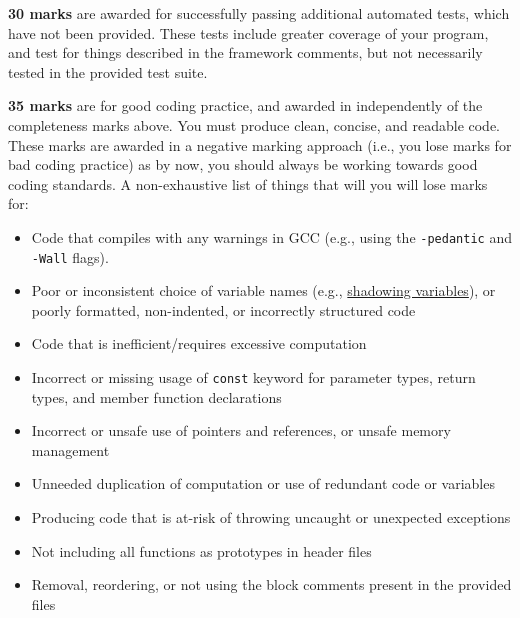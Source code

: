 \documentclass[a4paper]{article}
\begin{document}
\noindent{}\textbf{30 marks} are awarded for successfully passing additional automated tests, which have not been provided. These tests include greater coverage of your program, and test for things described in the framework comments, but not necessarily tested in the provided test suite.

\noindent{}\textbf{35 marks} are for good coding practice, and awarded in independently of the completeness marks above. You must produce clean, concise, and readable code. These marks are awarded in a negative marking approach (i.e., you lose marks for bad coding practice) as by now, you should always be working towards good coding standards. A non-exhaustive list of things that will you will lose marks for:
\begin{itemize}
    \item Code that compiles with any warnings in GCC (e.g., using the \texttt{-pedantic} and \texttt{-Wall} flags).

    \item Poor or inconsistent choice of variable names (e.g., \hyperlink{https://en.wikipedia.org/wiki/Variable_shadowing}{shadowing variables}), or poorly formatted, non-indented, or incorrectly structured code

    \item Code that is inefficient/requires excessive computation

    \item Incorrect or missing usage of \texttt{const} keyword for parameter types, return types, and member function declarations

    \item Incorrect or unsafe use of pointers and references, or unsafe memory management

    \item Unneeded duplication of computation or use of redundant code or variables

    \item Producing code that is at-risk of throwing uncaught or unexpected exceptions

    \item Not including all functions as prototypes in header files

    \item Removal, reordering, or not using the block comments present in the provided files


\end{itemize}
\end{document}
